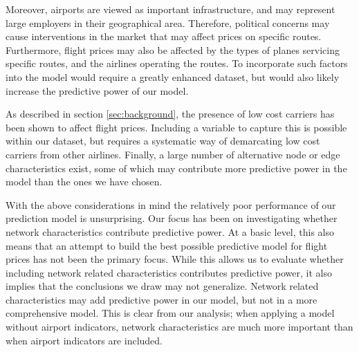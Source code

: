 Moreover, airports are viewed as important infrastructure, and may represent large employers in their geographical area. Therefore, political concerns may cause interventions in the market that may affect prices on specific routes. Furthermore, flight prices may also be affected by the types of planes servicing specific routes, and the airlines operating the routes. To incorporate such factors into the model would require a greatly enhanced dataset, but would also likely increase the predictive power of our model.

As described in section \ref{sec:background}, the presence of low cost carriers has been shown to affect flight prices. Including a variable to capture this is possible within our dataset, but requires a systematic way of demarcating low cost carriers from other airlines. 
Finally, a large number of alternative node or edge characteristics exist, some of which may contribute more predictive power in the model than the ones we have chosen. 

With the above considerations in mind the relatively poor performance of our prediction model is unsurprising. Our focus has been on investigating whether network characteristics contribute predictive power. At a basic level, this also means that an attempt to build the best possible predictive model for flight prices has not been the primary focus. While this allows us to evaluate whether including network related characteristics contributes predictive power, it also implies that the conclusions we draw may not generalize. Network related characteristics may add predictive power in our model, but not in a more comprehensive model. This is clear from our analysis; when applying a model without airport indicators, network characteristics are much more important than when airport indicators are included. 
